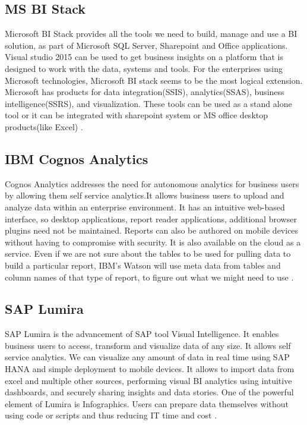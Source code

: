 \subsection{MS BI Stack}

Microsoft BI Stack provides all the tools we need to build, manage and use a BI solution, as part of Microsoft SQL Server, Sharepoint and Office applications. Visual studio 2015 can be used to get business insights on a platform that is designed to work with the data, systems and tools. For the enterprises using Microsoft technologies, Microsoft BI stack seems to be the most logical extension. Microsoft has products for data integration(SSIS), analytics(SSAS), business intelligence(SSRS), and visualization. These tools can be used as a stand alone tool or it can be integrated with sharepoint system or MS office desktop products(like Excel) \cite{MS}.

\subsection{IBM Cognos Analytics }

Cognos Analytics addresses the need for autonomous analytics for business users by allowing them self service analytics.It allows business users to upload and analyze data within an enterprise environment. It has an intuitive web-based interface, so desktop applications, report reader applications, additional browser plugins need not be maintained. Reports can also be authored on mobile devices without having to compromise with security. It is also available on the cloud as a service. Even if we are not sure about the tables to be used for pulling data to build a particular report, IBM's Watson will use meta data from tables and column names of that type of report, to figure out what we might need to use \cite{cognos}. 

\subsection{SAP Lumira}

SAP Lumira is the advancement of SAP tool Visual Intelligence. It enables business users to access, transform and visualize data of any size. It allows self service analytics. We can visualize any amount of data in real time using SAP HANA and simple deployment to mobile devices. It allows to import data from excel and multiple other sources, performing visual BI analytics using intuitive dashboards, and securely sharing insights and data stories. One of the powerful element of Lumira is Infographics. Users can prepare data themselves without using code or scripts and thus reducing IT time and cost \cite{SAP}.



